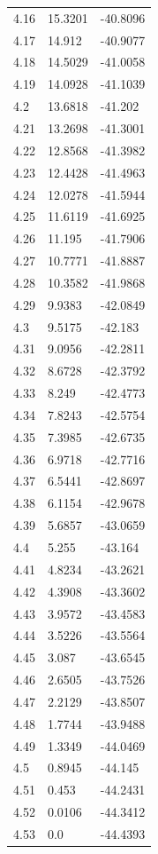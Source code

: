 \begin{table}
\begin{tabular}{lll}
4.16 & 15.3201 & -40.8096 \\
4.17 & 14.912 & -40.9077 \\
4.18 & 14.5029 & -41.0058 \\
4.19 & 14.0928 & -41.1039 \\
4.2 & 13.6818 & -41.202 \\
4.21 & 13.2698 & -41.3001 \\
4.22 & 12.8568 & -41.3982 \\
4.23 & 12.4428 & -41.4963 \\
4.24 & 12.0278 & -41.5944 \\
4.25 & 11.6119 & -41.6925 \\
4.26 & 11.195 & -41.7906 \\
4.27 & 10.7771 & -41.8887 \\
4.28 & 10.3582 & -41.9868 \\
4.29 & 9.9383 & -42.0849 \\
4.3 & 9.5175 & -42.183 \\
4.31 & 9.0956 & -42.2811 \\
4.32 & 8.6728 & -42.3792 \\
4.33 & 8.249 & -42.4773 \\
4.34 & 7.8243 & -42.5754 \\
4.35 & 7.3985 & -42.6735 \\
4.36 & 6.9718 & -42.7716 \\
4.37 & 6.5441 & -42.8697 \\
4.38 & 6.1154 & -42.9678 \\
4.39 & 5.6857 & -43.0659 \\
4.4 & 5.255 & -43.164 \\
4.41 & 4.8234 & -43.2621 \\
4.42 & 4.3908 & -43.3602 \\
4.43 & 3.9572 & -43.4583 \\
4.44 & 3.5226 & -43.5564 \\
4.45 & 3.087 & -43.6545 \\
4.46 & 2.6505 & -43.7526 \\
4.47 & 2.2129 & -43.8507 \\
4.48 & 1.7744 & -43.9488 \\
4.49 & 1.3349 & -44.0469 \\
4.5 & 0.8945 & -44.145 \\
4.51 & 0.453 & -44.2431 \\
4.52 & 0.0106 & -44.3412 \\
4.53 & 0.0 & -44.4393 \\
\bottomrule
\end{tabular}
\end{table}
